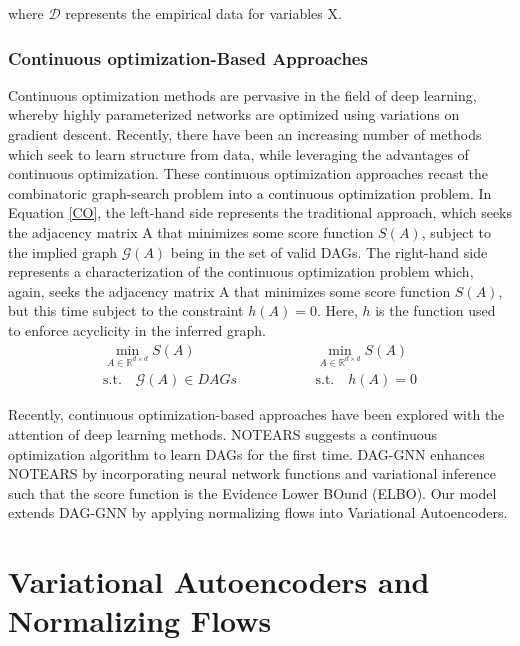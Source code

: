 \documentclass[10pt]{article}
\begin{document}
where $\mathcal{D}$ represents the empirical data for variables X. 

\subsubsection{Continuous optimization-Based Approaches}

Continuous optimization methods are pervasive in the field of deep learning, whereby highly parameterized networks are optimized using variations on gradient descent\cite{Goodfellow}. Recently, there have been an increasing number of methods which seek to learn structure from data, while leveraging the advantages of continuous optimization. These continuous optimization approaches recast the combinatoric graph-search problem into a continuous optimization problem\cite{zheng2018dags}. In Equation \ref{CO}, the left-hand side represents the traditional approach, which seeks the adjacency matrix A that minimizes some score function $S(A)$, subject to the implied graph $\mathcal{G}(A)$ being in the set of valid DAGs. The right-hand side represents a characterization of the continuous optimization problem which, again, seeks the adjacency matrix A that minimizes some score function $S(A)$, but this time subject to the constraint $h(A) = 0$. Here, $h$ is the function used to enforce acyclicity in the inferred graph.
\begin{equation}
\label{CO}
\begin{aligned}  
    \min_{A \in \mathbb{R}^{d \times d}}S(A)  \qquad && \qquad \min_{A \in \mathbb{R}^{d \times d}}S(A) \\
    \text{s.t.} \quad \mathcal{G}(A) \in DAGs \qquad && \qquad \text{s.t.} \quad h(A) = 0
\end{aligned}
\end{equation}

Recently, continuous optimization-based approaches have been explored with the attention of deep learning methods. NOTEARS\cite{zheng2018dags} suggests a continuous optimization algorithm to learn DAGs for the first time. DAG-GNN\cite{yu2019daggnn} enhances NOTEARS by incorporating neural network functions and variational inference such that the score function is the Evidence Lower BOund (ELBO). Our model extends DAG-GNN by applying normalizing flows into Variational Autoencoders.


\section{Variational Autoencoders and Normalizing Flows}
\end{document}
